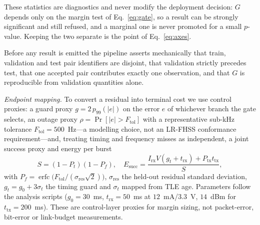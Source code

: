 \documentclass[conference]{IEEEtran}
\begin{document}
These statistics are diagnostics and never modify the deployment decision: $G$
depends only on the margin test of Eq.~\eqref{eq:gate}, so a result can be
strongly significant and still refused, and a marginal one is never promoted for
a small $p$-value. Keeping the two separate is the point of Eq.~\eqref{eq:axes}.

Before any result is emitted the pipeline asserts mechanically that train,
validation and test pair identifiers are disjoint, that validation strictly
precedes test, that one accepted pair contributes exactly one observation, and
that $G$ is reproducible from validation quantities alone.

\emph{Endpoint mapping.} To convert a residual into terminal cost we use control
proxies: a guard proxy $g = 2\,p_{99}(|e|)$ on the error $e$ of whichever branch
the gate selects, an outage proxy $\rho=\Pr[|e|>F_{\mathrm{tol}}]$ with a
representative sub-kHz tolerance $F_{\mathrm{tol}}=500$~Hz---a modelling choice,
not an LR-FHSS conformance requirement---and, treating timing and frequency
misses as independent, a joint success proxy and energy per burst
\begin{equation}
S=(1-P_t)(1-P_f),\quad
E_{\mathrm{succ}} = \frac{I_{\mathrm{rx}}V(g_t+t_{\mathrm{rx}})
+P_{\mathrm{tx}}t_{\mathrm{tx}}}{S},
\label{eq:esucc}
\end{equation}
with $P_f=\operatorname{erfc}\!\big(F_{\mathrm{tol}}/(\sigma_{\mathrm{res}}
\sqrt2)\big)$, $\sigma_{\mathrm{res}}$ the held-out residual standard deviation,
$g_t=g_0+3\sigma_t$ the timing guard and $\sigma_t$ mapped from TLE age.
Parameters follow the analysis scripts ($g_0=30$~ms, $t_{\mathrm{rx}}=50$~ms at
$12$~mA/$3.3$~V, $14$~dBm for $t_{\mathrm{tx}}=200$~ms). These are control-layer
proxies for margin sizing, not packet-error, bit-error or link-budget
measurements.
\end{document}
